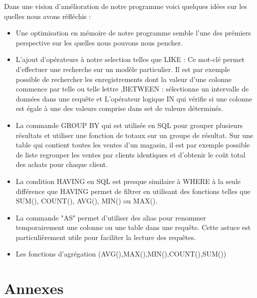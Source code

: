 \documentclass[oneside,13pt,a4paper]{report}
\begin{document}
 Dans une vision d'amélioration de notre programme voici quelques idées sur les quelles nous avons réfléchis :

\begin{itemize}
\item Une optimisation en mémoire de notre programme semble l'une des prémiers perspective sur les quelles nous pouvons nous pencher.
\item L'ajout d'opérateurs à notre selection telles que LIKE : Ce mot-clé permet d’effectuer une recherche sur un modèle particulier. Il est par exemple possible de rechercher les enregistrements dont la valeur d’une colonne commence par telle ou telle lettre ,BETWEEN : sélectionne un intervalle de données dans une requête et L’opérateur logique IN qui vérifie si une colonne est égale à une des valeurs comprise dans set de valeurs déterminés.
\item La commande GROUP BY qui est utilisée en SQL pour grouper plusieurs résultats et utiliser une fonction de totaux sur un groupe de résultat. Sur une table qui contient toutes les ventes d’un magasin, il est par exemple possible de liste regrouper les ventes par clients identiques et d’obtenir le coût total des achats pour chaque client.
\item La condition HAVING en SQL est presque similaire à WHERE à la seule différence que HAVING permet de filtrer en utilisant des fonctions telles que SUM(), COUNT(), AVG(), MIN() ou MAX().
\item La commande "AS" permet d’utiliser des alias pour renommer temporairement une colonne ou une table dans une requête. Cette astuce est particulièrement utile pour faciliter la lecture des requêtes.
\item Les fonctions d'agrégation (AVG(),MAX(),MIN(),COUNT(),SUM())
\end{itemize}

\chapter{Annexes}
\end{document}
